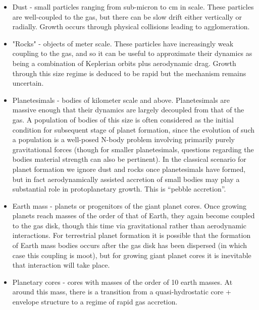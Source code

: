 \documentclass[12pt]{article}
\begin{document}
\begin{itemize}
    \item Dust - small particles ranging from sub-micron to cm in scale. These particles are well-coupled to the gas, but there can be slow drift either vertically or radially. Growth occurs through physical collisions leading to agglomeration.
    \item "Rocks" - objects of meter scale. These particles have increasingly weak coupling to the gas, and so it can be useful to approximate their dynamics as being a combination of Keplerian orbits plus aerodynamic drag. Growth through this size regime is deduced to be rapid but the mechanism remains uncertain.
    \item Planetesimals - bodies of kilometer scale and above. Planetesimals are massive enough that their dynamics are largely decoupled from that of the gas. A population of bodies of this size is often considered as the initial condition for subsequent stage of planet formation, since the evolution of such a population is a well-posed N-body problem involving primarily purely gravitational forces (though for smaller planetesimals, questions regarding the bodies material strength can also be pertinent). In the classical scenario for planet formation we ignore dust and rocks once planetesimals have formed, but in fact aerodynamically assisted accretion of small bodies may play a substantial role in protoplanetary growth.  This is “pebble accretion”.
    \item Earth mass - planets or progenitors of the giant planet cores. Once growing planets reach masses of the order of that of Earth, they again become coupled to the gas disk, though this time via gravitational rather than aerodynamic interactions. For terrestrial planet formation it is possible that the formation of Earth mass bodies occurs after the gas disk has been dispersed (in which case this coupling is moot), but for growing giant planet cores it is inevitable that interaction will take place.
    \item Planetary cores - cores with  masses  of  the  order  of 10 earth masses.  At around this mass, there is a transition from a quasi-hydrostatic core + envelope structure to a regime of rapid gas accretion.
\end{itemize}
\end{document}
